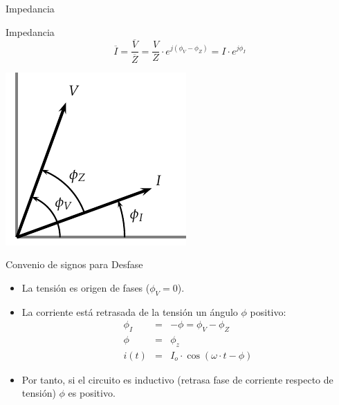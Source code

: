\documentclass[xcolor={usenames,svgnames,dvipsnames}]{beamer}
\begin{document}
\begin{frame}[label={sec:orgd959c53}]{Impedancia}
\end{frame}

\begin{frame}[label={sec:org5019cd3}]{Impedancia}
$$\overline{I}=\frac{\overline{V}}{\overline{Z}}=\frac{V}{Z}\cdot
e^{j(\phi_{V}-\phi_{Z})}=I\cdot e^{j\phi_{I}}$$
\begin{center}
\includegraphics[height=0.4\textheight]{../figs/Impedancia.pdf}
\end{center}
\end{frame}

\begin{frame}[label={sec:org45d234a}]{Convenio de signos para Desfase}
\begin{itemize}
\item La tensión es origen de fases (\(\phi_{V}=0\)).

\item La corriente está retrasada de la tensión un ángulo \(\phi\) positivo:
$$\begin{aligned}
         \phi_{I} & = & -\phi=\phi_{V}-\phi_{Z}\\
         \phi & = & \phi_{z}\\
         i(t) & = & I_{o}\cdot\cos(\omega\cdot t-\phi)
       \end{aligned}$$

\item Por tanto, \alert{si el circuito es inductivo (retrasa fase de corriente
respecto de tensión) \(\phi\) es positivo}.
\end{itemize}
\end{frame}
\end{document}
